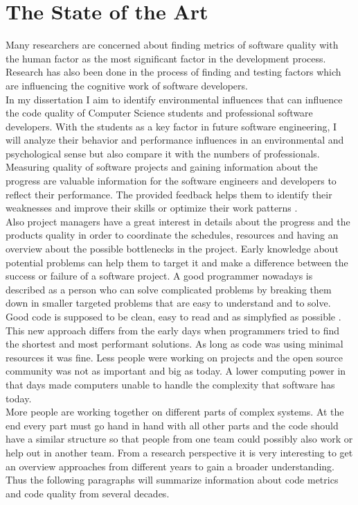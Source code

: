 \chapter{The State of the Art}

Many researchers are concerned about finding metrics of software quality with the human factor as the most significant factor in the development process. Research has also been done in the process of finding and testing factors which are influencing the cognitive work of software developers.\\
In my dissertation I aim to identify environmental influences that can influence the code quality of Computer Science students and professional software developers.
With the students as a key factor in future software engineering, I will analyze their behavior and performance influences in an environmental and psychological sense but also compare it with the numbers of professionals. \cite{denissen2008effects}
\bigbreak
Measuring quality of software projects and gaining information about the progress are valuable information for the software engineers and developers to reflect their performance. The provided feedback helps them to identify their weaknesses and improve their skills or optimize their work patterns \cite{johnson1999leap} \cite{Martin:2008:CCH:1388398}.\\
Also project managers have a great interest in details about the progress and the products quality in order to coordinate the schedules, resources and having an overview about the possible bottlenecks in the project.
Early knowledge about potential problems can help them to target it and make a difference between the success or failure of a software project.
\bigbreak
A good programmer nowadays is described as a person who can solve complicated problems by breaking them down in smaller targeted problems that are easy to understand and to solve. 
\\
Good code is supposed to be clean, easy to read and as simplyfied as possible \cite{johnson1999leap}.
\\
This new approach differs from the early days when programmers tried to find the shortest and most performant solutions. As long as code was using minimal resources it was fine. Less people were working on projects and the open source community was not as important and big as today. A lower computing power in that days made computers unable to handle the complexity that software has today. \\
More people are working together on different parts of complex systems. At the end every part must go hand in hand with all other parts and the code should have a similar structure so that people from one team could possibly also work or help out in another team.
\bigbreak
From a research perspective it is very interesting to get an overview approaches from different years to gain a broader understanding. Thus the following paragraphs will summarize information about code metrics and code quality from several decades.

